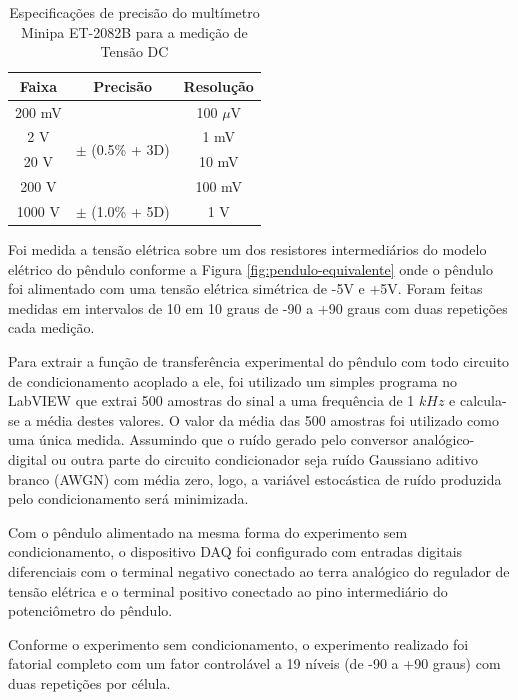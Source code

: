 \documentclass[a4paper]{instrumentacao}
\begin{document}
\begin{table}[H]
\centering
\caption{Especificações de precisão do multímetro Minipa ET-2082B para a medição de Tensão DC}
\label{tab:precisão-multimetro}
\begin{tabular}{|c|c|c|}
\hline
\textbf{Faixa} & \textbf{Precisão} & \textbf{Resolução} \\ \hline
200 mV         & \multirow{4}{*}{$\pm$ (0.5\% + 3D)} & 100 $\mu$V \\ \cline{1-1} \cline{3-3} 
2 V            &                              & 1 mV               \\ \cline{1-1} \cline{3-3} 
20 V           &                              & 10 mV              \\ \cline{1-1} \cline{3-3} 
200 V          &                              & 100 mV             \\ \hline
1000 V         & $\pm$ (1.0\% + 5D)           & 1 V                \\ \hline
\end{tabular}
\end{table}

Foi medida a tensão elétrica sobre um dos resistores intermediários do modelo elétrico do pêndulo conforme a Figura \ref{fig:pendulo-equivalente} onde o pêndulo foi alimentado com uma tensão elétrica simétrica de -5V e +5V. Foram feitas medidas em intervalos de 10 em 10 graus de -90 a +90 graus com duas repetições cada medição.

\label{sec:pendulo-calibracao-condicionado}

Para extrair a função de transferência experimental do pêndulo com todo circuito de condicionamento acoplado a ele, foi utilizado um simples programa no LabVIEW que extrai 500 amostras do sinal a uma frequência de 1 $kHz$ e calcula-se a média destes valores. O valor da média das 500 amostras foi utilizado como uma única medida. Assumindo que o ruído gerado pelo conversor analógico-digital ou outra parte do circuito condicionador seja ruído Gaussiano aditivo branco (AWGN) com média zero, logo, a variável estocástica de ruído produzida pelo condicionamento será minimizada.

Com o pêndulo alimentado na mesma forma do experimento sem condicionamento, o dispositivo DAQ foi configurado com entradas digitais diferenciais com o terminal negativo conectado ao terra analógico do regulador de tensão elétrica e o terminal positivo conectado ao pino intermediário do potenciômetro do pêndulo.

Conforme o experimento sem condicionamento, o experimento realizado foi fatorial completo com um fator controlável a 19 níveis (de -90 a +90 graus) com duas repetições por célula.
\end{document}
